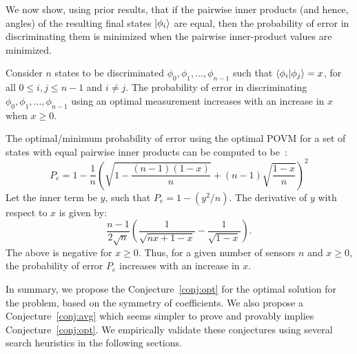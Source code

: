 We now show, using prior results, that 
if the pairwise inner products (and hence, angles) 
of the resulting final states $\ket{\phi_i}$ are equal, then the 
probability of error in discriminating them 
is minimized when the pairwise inner-product values are minimized. 

\begin{lem-prf}
Consider $n$ states to be discriminated $\phi_0, \phi_1, \ldots, \phi_{n-1}$ 
such that $\bra{\phi_i}\ket{\phi_j} = x$,
for all $0 \leq i, j \leq n-1$ and $i \neq j$. 
The probability of error in discriminating 
$\phi_0, \phi_1, \ldots, \phi_{n-1}$ using an optimal measurement 
increases with an increase in $x$ when $x \geq 0$.
\label{lemma:angle}
\end{lem-prf}
\begin{prf}
The optimal/minimum probability of error using the optimal POVM for a set of states with equal pairwise inner products can be computed to be~\cite{quantum_pyramid}:
$$P_e = 1- \frac{1}{n}\left(\sqrt{1-\frac{(n-1)(1-x)}{n}} + (n-1)\sqrt{\frac{1-x}{n}}\right)^2$$
Let the inner term be $y$, such that $P_e = 1 - (y^2/n)$. The derivative of $y$ with respect to $x$ is given by:
$$ \frac{n-1}{2\sqrt{n}}\left(\frac{1}{\sqrt{nx+1-x}} - \frac{1}{\sqrt{1-x}}\right).$$
The above is negative for $x \geq 0$. Thus, for a given number of sensors $n$ and $x \geq 0$, the probability of error $P_e$ increases with an increase in $x$.
\end{prf}

In summary, we propose the Conjecture~\ref{conj:opt} for the optimal solution for the \iso problem, based on the symmetry of coefficients. 
We also propose a Conjecture~\ref{conj:avg} which seems simpler to prove and provably implies Conjecture~\ref{conj:opt}. 
We empirically validate these conjectures using several search heuristics in the following sections.  